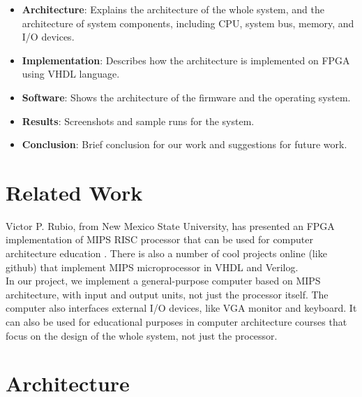 \documentclass[oneside]{book}
\begin{document}
\begin{itemize}

\item \textbf{Architecture}: Explains the architecture of the whole system,
and the architecture of system components, including CPU, system bus,
memory, and I/O devices.

\item \textbf{Implementation}: Describes how the architecture is implemented
on FPGA using VHDL language.

\item \textbf{Software}: Shows the architecture of the firmware and the
operating system.

\item \textbf{Results}: Screenshots and sample runs for the system.

\item \textbf{Conclusion}: Brief conclusion for our work and suggestions for
future work.

\end{itemize}


\chapter{Related Work}

Victor P. Rubio, from New Mexico State University, has presented an
FPGA implementation of MIPS RISC processor that can be used for
computer architecture education \cite{victor}.
There is also a number of cool projects
online (like github) that implement MIPS microprocessor in VHDL and Verilog.\\

In our project, we implement a general-purpose computer based on
MIPS architecture, with input and output units, not just the processor
itself. The computer also interfaces external I/O devices, like
VGA monitor and keyboard. It can also be used for educational purposes
in computer architecture
courses that focus on the design of the whole system, not just the processor.\\


\chapter{Architecture}
\end{document}
